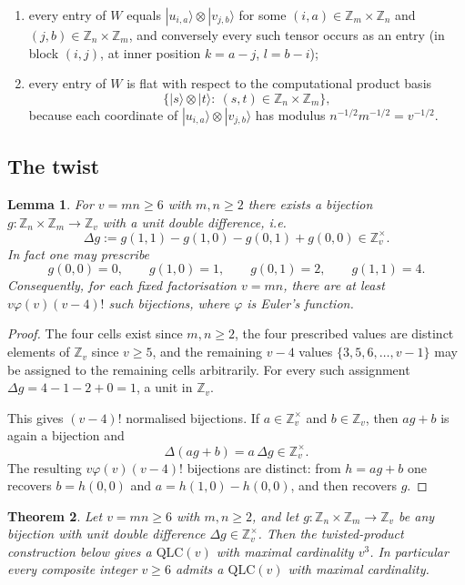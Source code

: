 \documentclass[11pt]{amsart}
\newtheorem{theorem}{Theorem}[section]
\newtheorem{lemma}[theorem]{Lemma}
\theoremstyle{definition}
\newcommand{\Z}{\mathbb{Z}}
\newcommand{\ket}[1]{|#1\rangle}
\newcommand{\QLC}{\mathrm{QLC}}
\begin{document}
\begin{enumerate}
\item every entry of $W$ equals $\ket{u_{i,a}}\otimes\ket{v_{j,b}}$ for
some $(i,a)\in\Z_m\times\Z_n$ and $(j,b)\in\Z_n\times\Z_m$, and conversely
every such tensor occurs as an entry (in block $(i,j)$, at inner position
$k=a-j$, $l=b-i$);
\item every entry of $W$ is flat with respect to the computational product
basis
\[
\{\ket s\otimes\ket t:\ (s,t)\in\Z_n\times\Z_m\},
\]
because each coordinate of $\ket{u_{i,a}}\otimes\ket{v_{j,b}}$ has modulus
$n^{-1/2}m^{-1/2}=v^{-1/2}$.
\end{enumerate}

\subsection{The twist}

\begin{lemma}\label{lem:assignment}
For $v=mn\ge6$ with $m,n\ge2$ there exists a bijection
$g:\Z_n\times\Z_m\to\Z_v$ with a \emph{unit double difference}, i.e.
\[
\Delta g:=g(1,1)-g(1,0)-g(0,1)+g(0,0)\in\Z_v^\times .
\]
In fact one may prescribe
\[
g(0,0)=0,\qquad g(1,0)=1,\qquad g(0,1)=2,\qquad g(1,1)=4 .
\]
Consequently, for each fixed factorisation $v=mn$, there are at least
$v\varphi(v)(v-4)!$ such bijections, where $\varphi$ is Euler's function.
\end{lemma}

\begin{proof}
The four cells exist since $m,n\ge2$, the four prescribed values are
distinct elements of $\Z_v$ since $v\ge5$, and the remaining $v-4$ values
$\{3,5,6,\dots,v-1\}$ may be assigned to the remaining cells arbitrarily.
For every such assignment $\Delta g=4-1-2+0=1$, a unit in $\Z_v$.

This gives $(v-4)!$ normalised bijections.  If $a\in\Z_v^\times$ and
$b\in\Z_v$, then $ag+b$ is again a bijection and
\[
\Delta(ag+b)=a\,\Delta g\in\Z_v^\times .
\]
The resulting $v\varphi(v)(v-4)!$ bijections are distinct: from $h=ag+b$
one recovers $b=h(0,0)$ and $a=h(1,0)-h(0,0)$, and then recovers $g$.
\end{proof}

\begin{theorem}\label{thm:composite}
Let $v=mn\ge6$ with $m,n\ge2$, and let
$g:\Z_n\times\Z_m\to\Z_v$ be any bijection with unit double difference
$\Delta g\in\Z_v^\times$.  Then the twisted-product construction below gives
a $\QLC(v)$ with maximal cardinality $v^3$.  In particular every composite
integer $v\ge6$ admits a $\QLC(v)$ with maximal cardinality.
\end{theorem}
\end{document}

